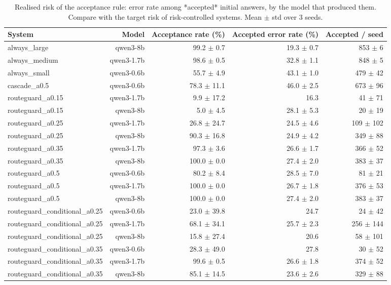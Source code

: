 \begin{table}[t]
\centering
\small
\caption{Realised risk of the acceptance rule: error rate among *accepted* initial answers, by the model that produced them. Compare with the target risk of risk-controlled systems. Mean $\pm$ std over 3 seeds.}
\label{tab:acceptance}
\begin{tabular}{lrrrr}
\toprule
System & Model & Acceptance rate (\%) & Accepted error rate (\%) & Accepted / seed \\
\midrule
always\_large & qwen3-8b & 99.2 $\pm$ 0.7 & 19.3 $\pm$ 0.7 & 853 $\pm$ 6 \\
always\_medium & qwen3-1.7b & 98.6 $\pm$ 0.5 & 32.8 $\pm$ 1.1 & 848 $\pm$ 5 \\
always\_small & qwen3-0.6b & 55.7 $\pm$ 4.9 & 43.1 $\pm$ 1.0 & 479 $\pm$ 42 \\
cascade\_a0.5 & qwen3-0.6b & 78.3 $\pm$ 11.1 & 46.0 $\pm$ 2.5 & 673 $\pm$ 96 \\
routeguard\_a0.15 & qwen3-1.7b & 9.9 $\pm$ 17.2 & 16.3 & 41 $\pm$ 71 \\
routeguard\_a0.15 & qwen3-8b & 5.0 $\pm$ 4.5 & 28.1 $\pm$ 5.3 & 20 $\pm$ 19 \\
routeguard\_a0.25 & qwen3-1.7b & 26.8 $\pm$ 24.7 & 24.5 $\pm$ 4.6 & 109 $\pm$ 102 \\
routeguard\_a0.25 & qwen3-8b & 90.3 $\pm$ 16.8 & 24.9 $\pm$ 4.2 & 349 $\pm$ 88 \\
routeguard\_a0.35 & qwen3-1.7b & 97.3 $\pm$ 3.6 & 26.6 $\pm$ 1.7 & 366 $\pm$ 52 \\
routeguard\_a0.35 & qwen3-8b & 100.0 $\pm$ 0.0 & 27.4 $\pm$ 2.0 & 383 $\pm$ 37 \\
routeguard\_a0.5 & qwen3-0.6b & 80.2 $\pm$ 8.4 & 28.5 $\pm$ 7.0 & 81 $\pm$ 21 \\
routeguard\_a0.5 & qwen3-1.7b & 100.0 $\pm$ 0.0 & 26.7 $\pm$ 1.8 & 376 $\pm$ 53 \\
routeguard\_a0.5 & qwen3-8b & 100.0 $\pm$ 0.0 & 27.4 $\pm$ 2.0 & 383 $\pm$ 37 \\
routeguard\_conditional\_a0.25 & qwen3-0.6b & 23.0 $\pm$ 39.8 & 24.7 & 24 $\pm$ 42 \\
routeguard\_conditional\_a0.25 & qwen3-1.7b & 68.1 $\pm$ 34.1 & 25.7 $\pm$ 2.3 & 256 $\pm$ 144 \\
routeguard\_conditional\_a0.25 & qwen3-8b & 15.8 $\pm$ 27.4 & 20.6 & 58 $\pm$ 101 \\
routeguard\_conditional\_a0.35 & qwen3-0.6b & 28.3 $\pm$ 49.0 & 27.8 & 30 $\pm$ 52 \\
routeguard\_conditional\_a0.35 & qwen3-1.7b & 99.6 $\pm$ 0.5 & 26.6 $\pm$ 1.8 & 374 $\pm$ 52 \\
routeguard\_conditional\_a0.35 & qwen3-8b & 85.1 $\pm$ 14.5 & 23.6 $\pm$ 2.6 & 329 $\pm$ 88 \\
\bottomrule
\end{tabular}
\end{table}
